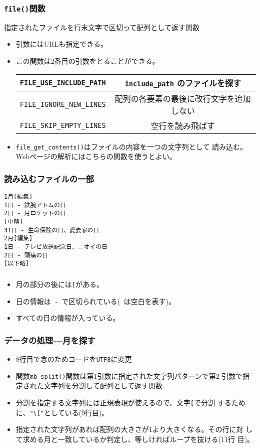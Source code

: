 \begin{frame}[containsverbatim]
\frametitle{\texttt{file()}関数}
指定されたファイルを行末文字で区切って配列として返す関数\\
\begin{itemize}
\item 引数にはURLも指定できる。
\item この関数は2番目の引数をとることができる。
\begin{center}
 \begin{tabular}{|c|c|}\hline
 \verb+FILE_USE_INCLUDE_PATH+ & \verb+include_path+ のファイルを探す\\\hline
 \verb+FILE_IGNORE_NEW_LINES+ & 配列の各要素の最後に改行文字を追加しない
      \\ \hline
  \verb+FILE_SKIP_EMPTY_LINES+&空行を読み飛ばす \\ \hline
 \end{tabular}
\end{center}
 \item \verb+file_get_contents()+はファイルの内容を一つの文字列として
       読み込む。Webページの解析にはこちらの関数を使うとよい。
\end{itemize}
\end{frame}
\begin{frame}[containsverbatim]
\frametitle{読み込むファイルの一部}
\begin{verbatim}
1月[編集]
1日 - 鉄腕アトムの日
2日 - 月ロケットの日
[中略]
31日 - 生命保険の日、愛妻家の日
2月[編集]
1日 - テレビ放送記念日、ニオイの日
2日 - 頭痛の日
[以下略]
\end{verbatim}
\end{frame}
\begin{frame}[containsverbatim]
\frametitle{}
\begin{itemize}
 \item 月の部分の後には\texttt{[}がある。
 \item 日の情報は\verb*+ - +で区切られている(\verb*+ +は空白を表す)。
 \item すべての日の情報が入っている。
\end{itemize}
\end{frame}
\begin{frame}[containsverbatim]
\frametitle{データの処理---月を探す}
\begin{itemize}
 \item 8行目で念のためコードを\texttt{UTF8}に変更
 \item 関数\verb+mb_split()+関数は第1引数に指定された文字列パターンで第2
       引数で指定された文字列を分割して配列として返す関数
 \item 分割を指定する文字列には正規表現が使えるので、文字\verb+[+で分割
       するために、\verb+"\["+としている(9行目)。
 \item 指定された文字列があれば配列の大きさが1より大きくなる。その行に対
       して求める月と一致しているか判定し、等しければループを抜ける(11行
       目)。
\end{itemize}
\end{frame}
